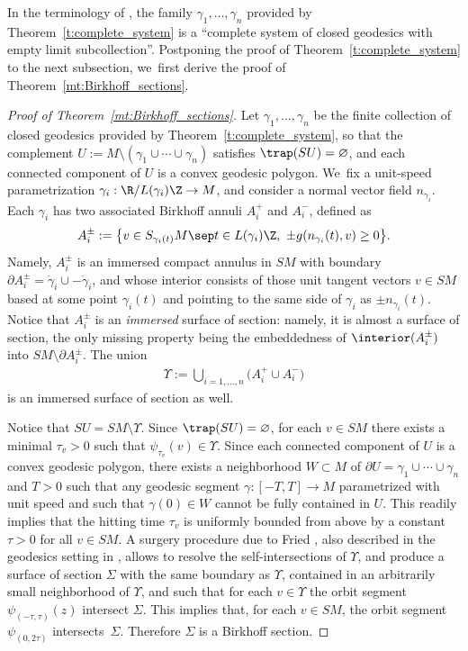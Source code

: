 In the terminology of \cite[\S 4.2]{Contreras:2022ab}, the family $\gamma_1,\dots,\gamma_n$ provided by Theorem~\ref{t:complete_system} is a ``complete system of closed geodesics with empty limit subcollection''. Postponing the proof of Theorem~\ref{t:complete_system} to the next subsection, we~first derive the proof of Theorem~\ref{mt:Birkhoff_sections}.

\begin{proof}[Proof of Theorem~\ref{mt:Birkhoff_sections}]
Let $\gamma_1,\dots,\gamma_n$ be the finite collection of closed geodesics provided by Theorem~\ref{t:complete_system}, so that the complement $U:=M\setminus(\gamma_1\cup\cdots\cup\gamma_n)$ satisfies $\trap(SU)=\varnothing$, and each connected component of $U$ is a convex geodesic polygon. We~fix a unit-speed parametrization $\gamma_i:\R/L(\gamma_i)\Z\to M$, and consider a normal vector field $n_{\gamma_i}$. Each $\gamma_i$ has two associated Birkhoff annuli $A_i^+$ and $A_i^-$, defined as
\begin{align*}
A_i^\pm:=\big\{ v\in S_{\gamma_i(t)}M\sep t\in L(\gamma_i)\Z,\ \pm g(n_{\gamma_i}(t),v)\geq0\big\}.
\end{align*}
Namely, $A_i^\pm$ is an immersed compact annulus in $SM$ with boundary $\partial A_i^\pm=\dot\gamma_i\cup-\dot\gamma_i$, and whose interior consists of those unit tangent vectors $v\in SM$ based at some point $\gamma_i(t)$ and pointing to the same side of $\gamma_i$ as $\pm n_{\gamma_i}(t)$. Notice that $A_i^\pm$ is an \emph{immersed} surface of section: namely, it is almost a surface of section, the only missing property being the embeddedness of $\interior(A_i^\pm)$ into $SM\setminus\partial A_i^\pm$. The union
\begin{align*}
\Upsilon:=\bigcup_{i=1,\dots,n} \big(A_i^+ \cup A_i^-\big)
\end{align*}
is an immersed surface of section as well.

Notice that $SU=SM\setminus\Upsilon$. Since $\trap(SU)=\varnothing$, for each $v\in SM$ there exists a minimal $\tau_v>0$ such that $\psi_{\tau_v}(v)\in\Upsilon$. Since each connected component of $U$ is a convex geodesic polygon, there exists a neighborhood $W\subset M$ of $\partial U=\gamma_1\cup\cdots\cup\gamma_n$ and $T>0$ such that any geodesic segment $\gamma:[-T,T]\to M$ parametrized with unit speed and such that $\gamma(0)\in W$ cannot be fully contained in $U$. This readily implies that the hitting time $\tau_v$ is uniformly bounded from above by a constant $\tau>0$ for all $v\in SM$. A surgery procedure due to Fried \cite{Fried:1983aa}, also described in the geodesics setting in \cite[\S 4.1]{Contreras:2022ab}, allows to resolve the self-intersections of $\Upsilon$, and produce a surface of section $\Sigma$ with the same boundary as $\Upsilon$, contained in an arbitrarily small neighborhood of $\Upsilon$, and such that for each $v\in\Upsilon$ the orbit segment $\psi_{(-\tau,\tau)}(z)$ intersect $\Sigma$. This implies that, for each $v\in SM$, the orbit segment $\psi_{(0,2\tau)}$ intersects~$\Sigma$. Therefore $\Sigma$ is a Birkhoff section.
\end{proof}


